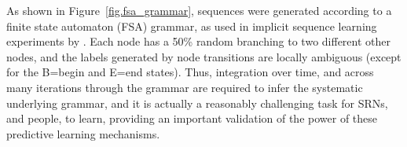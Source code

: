 \documentclass[11pt,twoside]{article}
\newif\myifpdf
\begin{document}
As shown in Figure~\ref{fig.fsa_grammar}, sequences were generated according to a finite state automaton (FSA) grammar, as used in implicit sequence learning experiments by \citet{Reber67}.  Each node has a 50\% random branching to two different other nodes, and the labels generated by node transitions are locally ambiguous (except for the B=begin and E=end states).  Thus, integration over time, and across many iterations through the grammar are required to infer the systematic underlying grammar, and it is actually a reasonably challenging task for SRNs, and people, to learn, providing an important validation of the power of these predictive learning mechanisms.
\end{document}
